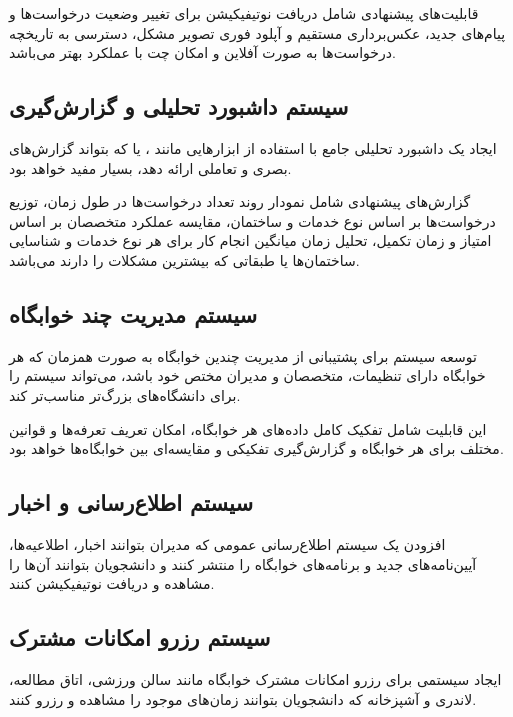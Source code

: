 \documentclass[12pt,a4paper]{report}
\begin{document}
	قابلیت‌های پیشنهادی شامل دریافت نوتیفیکیشن  برای تغییر وضعیت درخواست‌ها و پیام‌های جدید، عکس‌برداری مستقیم و آپلود فوری تصویر مشکل، دسترسی به تاریخچه درخواست‌ها به صورت آفلاین و امکان چت  با عملکرد بهتر می‌باشد.
	
	\subsection{سیستم داشبورد تحلیلی و گزارش‌گیری}
	
	ایجاد یک داشبورد تحلیلی جامع با استفاده از ابزارهایی مانند ،  یا  که بتواند گزارش‌های بصری و تعاملی ارائه دهد، بسیار مفید خواهد بود.
	
	گزارش‌های پیشنهادی شامل نمودار روند تعداد درخواست‌ها در طول زمان، توزیع درخواست‌ها بر اساس نوع خدمات و ساختمان، مقایسه عملکرد متخصصان بر اساس امتیاز و زمان تکمیل، تحلیل زمان میانگین انجام کار برای هر نوع خدمات و شناسایی ساختمان‌ها یا طبقاتی که بیشترین مشکلات را دارند می‌باشد.
	
	\subsection{سیستم مدیریت چند خوابگاه}
	
	توسعه سیستم برای پشتیبانی از مدیریت چندین خوابگاه به صورت همزمان که هر خوابگاه دارای تنظیمات، متخصصان و مدیران مختص خود باشد، می‌تواند سیستم را برای دانشگاه‌های بزرگ‌تر مناسب‌تر کند.
	
	این قابلیت شامل تفکیک کامل داده‌های هر خوابگاه، امکان تعریف تعرفه‌ها و قوانین مختلف برای هر خوابگاه و گزارش‌گیری تفکیکی و مقایسه‌ای بین خوابگاه‌ها خواهد بود.
	
	\subsection{سیستم اطلاع‌رسانی و اخبار}
	
	افزودن یک سیستم اطلاع‌رسانی عمومی که مدیران بتوانند اخبار، اطلاعیه‌ها، آیین‌نامه‌های جدید و برنامه‌های خوابگاه را منتشر کنند و دانشجویان بتوانند آن‌ها را مشاهده و دریافت نوتیفیکیشن کنند.
	
	\subsection{سیستم رزرو امکانات مشترک}
	
	ایجاد سیستمی برای رزرو امکانات مشترک خوابگاه مانند سالن ورزشی، اتاق مطالعه، لاندری و آشپزخانه که دانشجویان بتوانند زمان‌های موجود را مشاهده و رزرو کنند.
	
\end{document}
